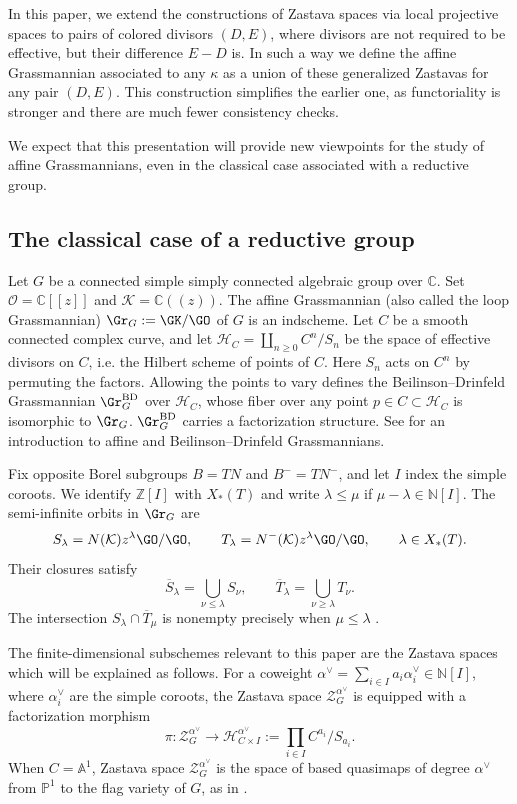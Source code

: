 \documentclass{amsart}
\numberwithin{equation}{section}
\numberwithin{figure}{section}
\theoremstyle{definition}
\theoremstyle{remark}
\renewcommand{\c}[1]{\mathcal{#1}}
\begin{document}
In this paper, we extend the constructions of Zastava spaces via
local projective spaces to pairs of colored divisors $(D,E)$,
where divisors are not required to be effective, but their
difference $E-D$ is. In such a way we define the affine Grassmannian associated to any $\kappa$ as a union of these generalized Zastavas for any pair $(D,E)$. This construction simplifies the earlier one, as functoriality is stronger and there are much fewer consistency checks.

We expect that this presentation will provide new viewpoints
for the study of affine Grassmannians, even in the classical case
associated with a reductive group.


\subsection{The classical case of a reductive group}
\label{subsec:introduction-grassmannians-zastava}

Let $G$ be a connected simple simply connected algebraic group over
$\mathbb C$. Set $\mathcal O=\mathbb C[\![z]\!]$ and
$\mathcal K=\mathbb C(\!(z)\!)$. The affine Grassmannian (also called the loop Grassmannian)
$\Gr_G:=\GK/\GO$ of $G$ is an indscheme.
Let $C$ be a smooth connected complex curve, and let
$\mathcal H_C=\coprod_{n\geq 0}C^n/S_n$ be the space of
effective divisors on $C$, i.e. the Hilbert scheme of points of $C$. Here \(S_n\) acts on \(C^n\) by permuting the factors.
Allowing the points to vary defines the
Beilinson--Drinfeld Grassmannian $\Gr^{\mathrm{BD}}_G$ over
$\mathcal H_C$, whose fiber over any point $p\in C\subset \c H_C$ is
isomorphic to $\Gr_G$. $\Gr^{\mathrm{BD}}_G$ carries a factorization
structure. See \cite{zhu2016introduction} for an introduction to
affine and Beilinson--Drinfeld Grassmannians.

Fix opposite Borel subgroups $B=TN$ and $B^-=TN^-$, and let
$I$ index the simple coroots. We identify $\mathbb Z[I]$ with
$X_*(T)$ and write $\lambda\leq\mu$ if
$\mu-\lambda\in\mathbb N[I]$.
The semi-infinite orbits in $\Gr_G$ are
\[
S_\lambda=N(\mathcal K)z^\lambda\GO/\GO,
\qquad
T_\lambda=N^-(\mathcal K)z^\lambda\GO/\GO,
\qquad \lambda\in X_*(T).
\]
Their closures satisfy
\[
\overline S_\lambda=\bigcup_{\nu\leq\lambda}S_\nu,
\qquad
\overline T_\lambda=\bigcup_{\nu\geq\lambda}T_\nu.
\]
The intersection $S_\lambda\cap\overline T_\mu$ is nonempty
precisely when $\mu\leq\lambda$
\cite{mirkovic2007geometric}.

The finite-dimensional subschemes relevant to this paper are the Zastava spaces which will be explained as follows. For a coweight $\alpha^\vee=\sum_{i\in I}a_i\alpha_i^\vee\in\mathbb N[I]$, where $\alpha_i^\vee$ are the simple coroots,
the Zastava space $\mathcal Z_G^{\alpha^\vee}$ is equipped with a
factorization morphism
\[
\pi:\mathcal Z_G^{\alpha^\vee}\longrightarrow
\mathcal H_{C\times I}^{\alpha^\vee}
:=\prod_{i\in I}C^{a_i}/S_{a_i}.
\]
When $C=\mathbb A^1$, Zastava space $\mathcal Z_G^{\alpha^\vee}$ is the space of based quasimaps of degree
$\alpha^\vee$ from $\mathbb P^1$ to the flag variety of $G$, as in
\cite{finkelberg1999semi}. 
\end{document}
